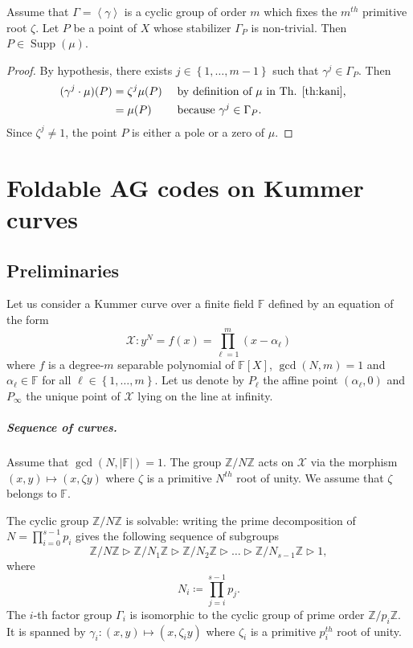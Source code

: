 \documentclass[a4paper,USenglish,autoref]{lipics-v2021}
\newcommand\F{\mathbb{F}}
\newcommand\Z{\mathbb{Z}}
\newcommand\gen[1]{\left\langle #1 \right\rangle}
\DeclareMathOperator{\Supp}{Supp}
\newcommand{\set}[1]{\left\{#1\right\}}
\newcommand{\size}[1]{\left|#1\right|}
\newcommand{\Range}[2]{\set{#1,\dots,#2}}
\newcommand\calX{\mathcal{X}}
\newcommand\mydef{\coloneqq}
\begin{document}
\begin{lemma}\label{lem:pts-ram}
	Assume that $\Gamma=\gen{\gamma}$ is a cyclic group of order $m$ which fixes the $m^{th}$ primitive root $\zeta$. Let $P$ be a point of $X$ whose stabilizer $\Gamma_P$ is non-trivial. Then ${P \in \Supp(\mu)}$.
\end{lemma}

\begin{proof}
	By hypothesis, there exists $j \in \Range{1}{m-1}$ such that $\gamma^j\in\Gamma_P$. Then
	\begin{align*}
		(\gamma^j\cdot \mu)(P)&=\zeta^j \mu(P) && \text{ by definition of } \mu\text{ in Th. \ref{th:kani},}&\\
		&= \mu(P) & &\text{ because }\gamma^j \in \Gamma_P.&
	\end{align*}
	Since $\zeta^j \neq 1$, the point $P$ is either a pole or a zero of $\mu$.
\end{proof}

\section{Foldable AG codes on Kummer curves}\label{subsec:Kummer}

\subsection{Preliminaries}

Let us consider a Kummer curve over a finite field $\F$ defined by an equation of the form 
\begin{equation}\label{eq:def-Kummer}\calX: y^N=f(x)=\prod_{\ell=1}^m (x-\alpha_\ell)\end{equation}
where $f$ is a degree-$m$ separable polynomial of $\F[X]$, $\gcd(N,m)=1$ and $\alpha_\ell \in \F$ for all $\ell \in \Range{1}{m}$. Let us denote by $P_\ell$ the affine point $(\alpha_\ell,0)$ and $P_\infty$ the unique point of $\calX$ lying on the line at infinity.


\subparagraph*{Sequence of curves.} Assume that $\gcd(N,\size{\F})=1$. 
The group $\Z/N\Z$ acts on $\calX$ via the morphism $(x,y) \mapsto (x,\zeta y)$ where $\zeta$ is a primitive $N^{th}$ root of unity. We assume that $\zeta$ belongs to $\F$.

The cyclic group $\Z/N\Z$ is solvable: writing the prime decomposition of $N=\prod_{i=0}^{s-1} p_i$ gives the following sequence of subgroups
\begin{equation}\label{eq:comp-series-kummer}
	\Z/N\Z \vartriangleright \Z/N_1\Z \vartriangleright \Z/N_2\Z \vartriangleright \dots \vartriangleright \Z/N_{s-1}\Z \vartriangleright 1, 
\end{equation}
where 
\begin{equation}\label{eq:def:N_i}
	N_i\mydef\prod_{j=i}^{s-1} p_j.
\end{equation}
The $i$-th factor group $\Gamma_i$ is isomorphic to the cyclic group of prime order $\Z/p_i \Z$. It is spanned by $\gamma_i:(x,y) \mapsto (x,\zeta_iy)$ where $\zeta_i$ is a primitive $p_i^{th}$ root of unity.
\end{document}

